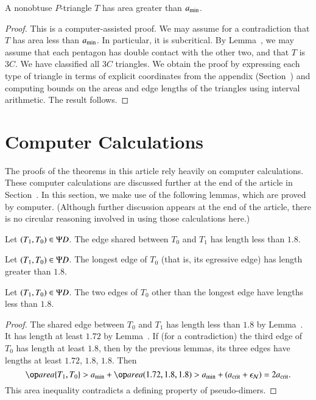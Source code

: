\begin{lemma}  
A nonobtuse $P$-triangle $T$ has area greater than $a_\text{min}$.
\end{lemma}

\begin{proof} 
  This is a computer-assisted proof.  We may assume for a contradiction
  that $T$ has area less than $a_\text{min}$.  In particular, it is
  subcritical.  By Lemma~, we may assume that each
  pentagon has double contact with the other two, and that $T$ is
  $3C$.  We have classified all $3C$ triangles.  We obtain the proof
  by expressing each type of triangle in terms of explicit
  coordinates from the appendix (Section~) and
  computing bounds on the areas and edge lengths of the triangles
  using interval arithmetic.  The result follows.
\end{proof}

\section{Computer Calculations}

The proofs of the theorems in this article rely heavily on computer
calculations.  These computer calculations are discussed further at
the end of the article in Section~.  In this section,
we make use of the following lemmas, which are proved by computer.
(Although further discussion appears at the end of the article, there
is no circular reasoning involved in using those calculations here.)

\begin{lemma}  
Let $(T_1,T_0)\in \Psi D$.  The edge shared between
$T_0$ and $T_1$ has length less than $1.8$. 
\end{lemma}

\begin{lemma} 
  Let $(T_1,T_0)\in \Psi D$.  The longest edge of $T_0$ (that is, its
  egressive edge) has length greater than $1.8$.
\end{lemma}

\begin{lemma}  
  Let $(T_1,T_0)\in \Psi D$.  The two edges of $T_0$ other than the
  longest edge have lengths less than $1.8$.
\end{lemma}

\begin{proof}
  The shared edge between $T_0$ and $T_1$ has length less than $1.8$
  by Lemma~.  It has length at least $1.72$ by
  Lemma~.  If (for a contradiction) the third edge of
  $T_0$ has length at least $1.8$, then by the previous lemmas, its
  three edges have lengths at least $1.72$, $1.8$, $1.8$.  Then
\[
\area\{T_1,T_0\} > \ao + \area(1.72,1.8,1.8) 
> \ao + (\acrit + \epsN) = 2\acrit.
\]
This area inequality contradicts a defining property of pseudo-dimers.
\end{proof}

